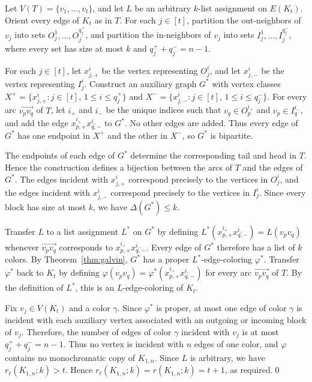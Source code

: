\documentclass[11pt]{article}
\theoremstyle{definition}
\theoremstyle{remark}
\begin{document}
Let \(V(T)=\{v_1,\ldots,v_t\}\), and let \(L\) be an arbitrary
\(k\)-list assignment on \(E(K_t)\). Orient every edge of \(K_t\) as
in \(T\). For each \(j\in[t]\), partition the out-neighbors of \(v_j\)
into sets \(O_j^1,\ldots,O_j^{q_j^+}\), and partition the in-neighbors
of \(v_j\) into sets \(I_j^1,\ldots,I_j^{q_j^-}\), where every set
has size at most \(k\) and \(q_j^++q_j^-=n-1\).

For each \(j\in[t]\), let \(x_{j,+}^i\) be the vertex representing
\(O_j^i\), and let \(x_{j,-}^i\) be the vertex representing \(I_j^i\).
Construct an auxiliary graph \(G^\ast\) with vertex classes
\(X^+=\{x_{j,+}^i:j\in[t],\,1\leq i\leq q_j^+\}\) and
\(X^-=\{x_{j,-}^i:j\in[t],\,1\leq i\leq q_j^-\}\). For every arc
\(\overrightarrow{v_pv_q}\) of \(T\), let \(i_+\) and \(i_-\) be the
unique indices such that \(v_q\in O_p^{i_+}\) and
\(v_p\in I_q^{i_-}\), and add the edge
\(x_{p,+}^{i_+}x_{q,-}^{i_-}\) to \(G^\ast\). No other edges are
added. Thus every edge of \(G^\ast\) has one endpoint in \(X^+\) and
the other in \(X^-\), so \(G^\ast\) is bipartite.

The endpoints of each edge of \(G^\ast\) determine the corresponding
tail and head in \(T\). Hence the construction defines a bijection
between the arcs of \(T\) and the edges of \(G^\ast\). The edges
incident with \(x_{j,+}^i\) correspond precisely to the vertices in
\(O_j^i\), and the edges incident with \(x_{j,-}^i\) correspond
precisely to the vertices in \(I_j^i\). Since every block has size at
most \(k\), we have \(\Delta(G^\ast)\leq k\).

Transfer \(L\) to a list assignment \(L^\ast\) on \(G^\ast\) by
defining
\(L^\ast(x_{p,+}^{i_+}x_{q,-}^{i_-})=L(v_pv_q)\) whenever
\(\overrightarrow{v_pv_q}\) corresponds to
\(x_{p,+}^{i_+}x_{q,-}^{i_-}\). Every edge of \(G^\ast\) therefore
has a list of \(k\) colors. By Theorem~\ref{thm:galvin}, \(G^\ast\)
has a proper \(L^\ast\)-edge-coloring \(\varphi^\ast\). Transfer
\(\varphi^\ast\) back to \(K_t\) by defining
\(\varphi(v_pv_q)=
\varphi^\ast(x_{p,+}^{i_+}x_{q,-}^{i_-})\) for every arc
\(\overrightarrow{v_pv_q}\) of \(T\). By the definition of
\(L^\ast\), this is an \(L\)-edge-coloring of \(K_t\).

Fix \(v_j\in V(K_t)\) and a color \(\gamma\). Since
\(\varphi^\ast\) is proper, at most one edge of color \(\gamma\) is
incident with each auxiliary vertex associated with an outgoing or
incoming block of \(v_j\). Therefore, the number of edges of color
\(\gamma\) incident with \(v_j\) is at most
\(q_j^++q_j^-=n-1\). Thus no vertex is incident with \(n\) edges of
one color, and \(\varphi\) contains no monochromatic copy of
\(K_{1,n}\). Since \(L\) is arbitrary, we have
\(r_{\ell}(K_{1,n};k)>t\). Hence
\(r_{\ell}(K_{1,n};k)=r(K_{1,n};k)=t+1\), as required.\qed
\end{document}
